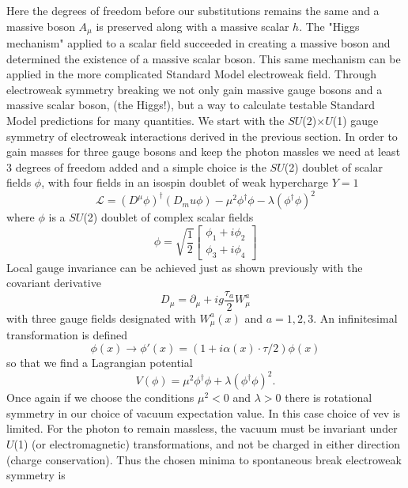 Here the degrees of freedom before our substitutions remains the same and a massive boson $A_\mu$ is preserved along with a massive scalar $h$. The "Higgs mechanism" applied to a scalar field succeeded in creating a massive boson and determined the existence of a massive scalar boson. This same mechanism can be applied in the more complicated Standard Model electroweak field. Through electroweak symmetry breaking we not only gain massive gauge bosons and a massive scalar boson, (the Higgs!), but a way to calculate testable Standard Model predictions for many quantities. We start with the $SU$(2)$\times$$U$(1) gauge symmetry of electroweak interactions derived in the previous section. In order to gain masses for three gauge bosons and keep the photon massles we need at least 3 degrees of freedom added and a simple choice is the $SU$(2) doublet of scalar fields $\phi$, with four fields in an isospin doublet of weak hypercharge $Y=1$ 
\begin{equation}
\mathcal{L} =(D^\mu \phi)^\dagger(D_mu\phi)-\mu^2\phi^\dagger\phi-\lambda(\phi^\dagger\phi)^2
\end{equation}
where $\phi$ is a $SU$(2) doublet of complex scalar fields
\begin{equation}
\phi = \sqrt{\frac{1}{2}}\begin{bmatrix}
	\phi_1+i\phi_2  \\
	\phi_3+i\phi_4
	\end{bmatrix}
\end{equation}
Local gauge invariance can be achieved just as shown previously with the covariant derivative 
\begin{equation}
D_\mu = \partial_\mu + ig \frac{\tau_a}{2}W_\mu^a
\end{equation}
with three gauge fields designated with $W_\mu^a(x)$ and $a=1,2,3$. An infinitesimal transformation is defined
\begin{equation}
\phi(x)\rightarrow \phi'(x) = (1+i\alpha(x)\cdot\tau/2)\phi(x)
\end{equation}
so that we find a Lagrangian potential 
\begin{equation}
V(\phi) = \mu^2\phi^\dagger\phi+\lambda(\phi^\dagger\phi)^2.
\end{equation}
Once again if we choose the conditions $\mu^2<0$ and $\lambda>0$ there is rotational symmetry in our choice of vacuum expectation value. In this case choice of vev is limited. For the photon to remain massless, the vacuum must be invariant under $U$(1) (or electromagnetic) transformations, and not be charged in either direction (charge conservation). Thus the chosen minima to spontaneous break electroweak symmetry is
$$
